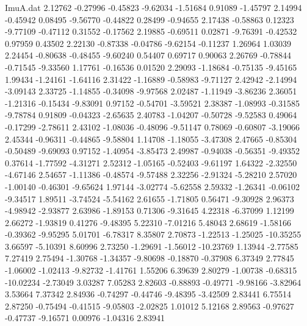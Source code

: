\begin{filecontents}{ImuA.dat}
   2.12762   -0.27996   -0.45823   -9.62034   -1.51684    0.91089   -1.45797
   2.14994   -0.45942    0.08495   -9.56770   -0.44822    0.28499   -0.94655
   2.17438   -0.58863    0.12323   -9.77109   -0.47112    0.31552   -0.17562
   2.19885   -0.69511    0.02871   -9.76391   -0.42532    0.97959    0.43502
   2.22130   -0.87338   -0.04786   -9.62154   -0.11237    1.26964    1.03039
   2.24454   -0.80638   -0.48455   -9.60240    0.54407    0.69717    0.90063
   2.26769   -0.78844   -0.71545   -9.33560    1.17761   -0.16536    0.01520
   2.29093   -1.18684   -0.75135   -9.45165    1.99434   -1.24161   -1.64116
   2.31422   -1.16889   -0.58983   -9.71127    2.42942   -2.14994   -3.09143
   2.33725   -1.14855   -0.34098   -9.97568    2.02487   -1.11949   -3.86236
   2.36051   -1.21316   -0.15434   -9.83091    0.97152   -0.54701   -3.59521
   2.38387   -1.08993   -0.31585   -9.78784    0.91809   -0.04323   -2.65635
   2.40783   -1.04207   -0.50728   -9.52583    0.49064   -0.17299   -2.78611
   2.43102   -1.08036   -0.48096   -9.51147    0.78069   -0.60807   -3.19066
   2.45344   -0.96311   -0.44865   -9.58804    1.14708   -1.18055   -3.47308
   2.47665   -0.85304   -0.50489   -9.69093    0.97152   -1.40954   -3.85473
   2.49987   -0.94038   -0.56351   -9.49352    0.37614   -1.77592   -4.31271
   2.52312   -1.05165   -0.52403   -9.61197    1.64322   -2.32550   -4.67146
   2.54657   -1.11386   -0.48574   -9.57488    2.32256   -2.91324   -5.28210
   2.57020   -1.00140   -0.46301   -9.65624    1.97144   -3.02774   -5.62558
   2.59332   -1.26341   -0.06102   -9.34517    1.89511   -3.74524   -5.54162
   2.61655   -1.71805    0.56471   -9.30928    2.96373   -4.98942   -2.93877
   2.63986   -1.89153    0.71306   -9.31645    4.22318   -6.37099    1.12199
   2.66272   -1.93819    0.41276   -9.48395    5.22310   -7.01216    5.48043
   2.68619   -1.58166   -0.39362   -9.95295    5.01701   -6.78317    8.35807
   2.70873   -1.22513   -1.25025  -10.35255    3.66597   -5.10391    8.60996
   2.73250   -1.29691   -1.56012  -10.23769    1.13944   -2.77585    7.27419
   2.75494   -1.30768   -1.34357   -9.80698   -0.18870   -0.37908    6.37349
   2.77845   -1.06002   -1.02413   -9.82732   -1.41761    1.55206    6.39639
   2.80279   -1.00738   -0.68315  -10.02234   -2.73049    3.03287    7.05283
   2.82603   -0.88893   -0.49771   -9.98166   -3.82964    3.53664    7.37342
   2.84936   -0.74297   -0.44746   -9.48395   -3.42509    2.83441    6.75514
   2.87250   -0.75494   -0.41515   -9.05803   -2.02825    1.01012    5.12168
   2.89563   -0.97627   -0.47737   -9.16571    0.00976   -1.04316    2.83941

\end{filecontents}
